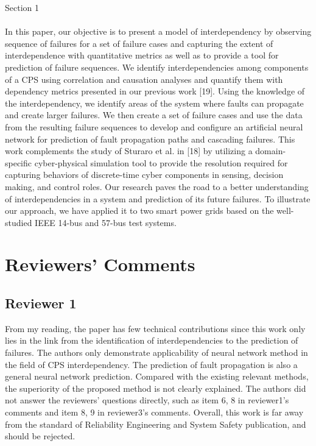 \documentclass{article}
\newenvironment{response}{
  \doublespacing
  \setlength\parindent{0.05\linewidth}
  \ttfamily
}{}
\newenvironment{textblock}[1]
{\begin{tcolorbox}[breakable,enhanced]{#1 \\ \\}}
{\end{tcolorbox}}
\begin{document}
\begin{response}
\begin{textblock}{Section 1}
In this paper, our objective is to present a model of interdependency by observing sequence of failures for a set of failure cases and capturing the extent of interdependence with quantitative metrics as well as to provide a tool for prediction of failure sequences. We identify interdependencies among components of a CPS using correlation and causation analyses and quantify them with dependency metrics presented in our previous work [19]. Using the knowledge of the interdependency, we identify areas of the system where faults can propagate and create larger failures. We then create a set of failure cases and use the data from the resulting failure sequences to develop and configure an artificial neural network for prediction of fault propagation paths and cascading failures. This work complements the study of Sturaro et al. in [18] by utilizing a domain-specific cyber-physical simulation tool to provide the resolution required for capturing behaviors of discrete-time cyber components in sensing, decision making, and control roles. Our research paves the road to a better understanding of interdependencies in a system and prediction of its future failures. To illustrate our approach, we have applied it to two smart power grids based on the well-studied IEEE 14-bus and 57-bus test systems.
\end{textblock}

\end{response}

\section{Reviewers' Comments}
\label{sec:reviewers}

\subsection{Reviewer 1}
\label{sec:reviewer:r1}
From my reading, the paper has few technical contributions since this work only lies in the link from the identification of interdependencies to the prediction of failures. The authors only demonstrate applicability of neural network method in the field of CPS interdependency. The prediction of fault propagation is also a general neural network prediction. Compared with the existing relevant methods, the superiority of the proposed method is not clearly explained. The authors did not answer the reviewers' questions directly, such as item 6, 8 in reviewer1's comments and item 8, 9 in reviewer3's comments. Overall, this work is far away from the standard of Reliability Engineering and System Safety publication, and should be rejected.
\end{document}
